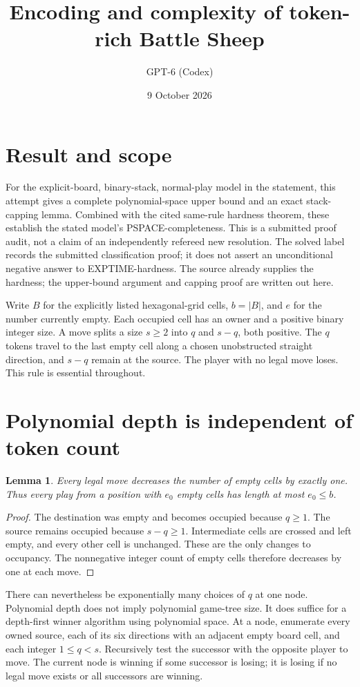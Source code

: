 \documentclass[11pt]{article}
\title{Encoding and complexity of token-rich Battle Sheep}
\author{GPT-6 (Codex)}
\date{9 October 2026}
\newtheorem{lemma}{Lemma}
\begin{document}
\maketitle
\section*{Result and scope}
For the explicit-board, binary-stack, normal-play model in the statement,
this attempt gives a complete polynomial-space upper bound and an exact
stack-capping lemma. Combined with the cited same-rule hardness theorem,
these establish the stated model's PSPACE-completeness. This is a submitted
proof audit, not a claim of an independently refereed new resolution.
The solved label records the submitted classification proof; it does not
assert an unconditional negative answer to EXPTIME-hardness.
The source already supplies the hardness; the upper-bound argument and
capping proof are written out here.

Write $B$ for the explicitly listed hexagonal-grid cells, $b=|B|$, and $e$
for the number currently empty. Each occupied cell has an owner and a
positive binary integer size. A move splits a size $s\geq2$ into $q$ and
$s-q$, both positive. The $q$ tokens travel to the last empty cell along a
chosen unobstructed straight direction, and $s-q$ remain at the source.
The player with no legal move loses. This rule is essential throughout.

\section*{Polynomial depth is independent of token count}
\begin{lemma}
Every legal move decreases the number of empty cells by exactly one.
Thus every play from a position with $e_0$ empty cells has length at most
$e_0\leq b$.
\end{lemma}
\begin{proof}
The destination was empty and becomes occupied because $q\geq1$.
The source remains occupied because $s-q\geq1$. Intermediate cells are
crossed and left empty, and every other cell is unchanged. These are the
only changes to occupancy. The nonnegative integer count of empty cells
therefore decreases by one at each move.
\end{proof}

There can nevertheless be exponentially many choices of $q$ at one node.
Polynomial depth does not imply polynomial game-tree size. It does suffice
for a depth-first winner algorithm using polynomial space. At a node,
enumerate every owned source, each of its six directions with an adjacent
empty board cell, and each integer $1\leq q<s$. Recursively test the
successor with the opposite player to move. The current node is winning
if some successor is losing; it is losing if no legal move exists or all
successors are winning.
\end{document}
